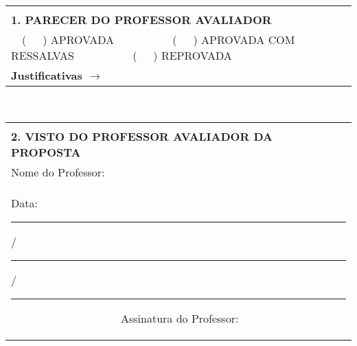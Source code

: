 \begin{titlepage}
{\renewcommand{\arraystretch}{1.5}
  \begin{table}
    \begin{tabular}{|p{15cm}|} \hline \\
      \textbf{1. PARECER DO PROFESSOR AVALIADOR} \\
      \ \ (\ \ \ ) APROVADA \ \ \ \ \ \ \ \ \ \  (\ \ \ ) APROVADA COM RESSALVAS \ \ \ \ \ \ \ \ \ \ (\ \ \ ) REPROVADA \\
      \hline
      \textbf{Justificativas $\to$} \\[18cm]
      \hline
    \end{tabular}
  \end{table}} \quad
\\
{\renewcommand{\arraystretch}{1.5}
  \begin{table}
    \begin{tabular}{|p{15cm}|} \hline \\
      \textbf{2. VISTO DO PROFESSOR AVALIADOR DA PROPOSTA} \\
Nome do Professor: \hrulefill \\
Data: \rule{.5cm}{.1mm}/\rule{.5cm}{.1mm}/\rule{1cm}{.1mm} \ \ \ \ \ \ \ \ \ \ \ \ \ \ \ \ \ \ \ \  Assinatura do Professor: \hrulefill \\
      \hline
    \end{tabular}
  \end{table}} \quad
\end{titlepage}
